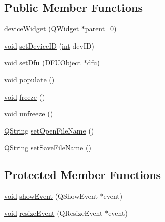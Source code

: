\subsection*{Public Member Functions}
\begin{DoxyCompactItemize}
\item 
\hyperlink{group___y_modem_uploader_gafcee9273f2b8216d324c235d5e164899}{device\-Widget} (Q\-Widget $\ast$parent=0)
\item 
\hyperlink{group___u_a_v_objects_plugin_ga444cf2ff3f0ecbe028adce838d373f5c}{void} \hyperlink{group___y_modem_uploader_ga9b64e94e398f8362d8dcae0b9ec4275f}{set\-Device\-I\-D} (\hyperlink{ioapi_8h_a787fa3cf048117ba7123753c1e74fcd6}{int} dev\-I\-D)
\item 
\hyperlink{group___u_a_v_objects_plugin_ga444cf2ff3f0ecbe028adce838d373f5c}{void} \hyperlink{group___y_modem_uploader_gadc475267f79d2e50ec5eac4f043aa058}{set\-Dfu} (D\-F\-U\-Object $\ast$dfu)
\item 
\hyperlink{group___u_a_v_objects_plugin_ga444cf2ff3f0ecbe028adce838d373f5c}{void} \hyperlink{group___uploader_gaf56d7d5fb2715ab7213ea4193df3b373}{populate} ()
\item 
\hyperlink{group___u_a_v_objects_plugin_ga444cf2ff3f0ecbe028adce838d373f5c}{void} \hyperlink{group___uploader_gac5513bd475a701ede81cde9432e8ddf2}{freeze} ()
\item 
\hyperlink{group___u_a_v_objects_plugin_ga444cf2ff3f0ecbe028adce838d373f5c}{void} \hyperlink{group___uploader_ga6273e94cd08759c019fbb9a1063cbd26}{unfreeze} ()
\item 
\hyperlink{group___u_a_v_objects_plugin_gab9d252f49c333c94a72f97ce3105a32d}{Q\-String} \hyperlink{group___uploader_ga6ad26364234edf8c743b0b08885050b1}{set\-Open\-File\-Name} ()
\item 
\hyperlink{group___u_a_v_objects_plugin_gab9d252f49c333c94a72f97ce3105a32d}{Q\-String} \hyperlink{group___uploader_ga1c33b640cfaca086fcfd5574eecec8ef}{set\-Save\-File\-Name} ()
\end{DoxyCompactItemize}
\subsection*{Protected Member Functions}
\begin{DoxyCompactItemize}
\item 
\hyperlink{group___u_a_v_objects_plugin_ga444cf2ff3f0ecbe028adce838d373f5c}{void} \hyperlink{group___y_modem_uploader_gae8c02916851ec8e041d9e2fb1be90a91}{show\-Event} (Q\-Show\-Event $\ast$event)
\item 
\hyperlink{group___u_a_v_objects_plugin_ga444cf2ff3f0ecbe028adce838d373f5c}{void} \hyperlink{group___y_modem_uploader_ga732d883048a75c6bac92c02fe90f2184}{resize\-Event} (Q\-Resize\-Event $\ast$event)
\end{DoxyCompactItemize}


